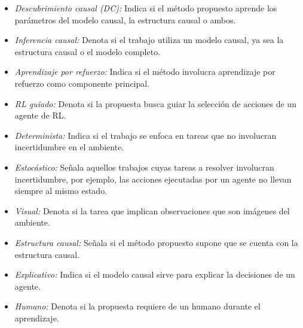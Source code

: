 \begin{itemize}
    \item \textit{Descubrimiento causal (DC):} Indica si el método propuesto aprende los parámetros del modelo causal, la estructura causal o ambos.
    \item \textit{Inferencia causal:} Denota si el trabajo utiliza un modelo causal, ya sea la estructura causal o el modelo completo.
    \item \textit{Aprendizaje por refuerzo:} Indica si el método involucra aprendizaje por refuerzo como componente principal.
    \item \textit{RL guiado:} Denota si la propuesta busca guiar la selección de acciones de un agente de RL.
    \item \textit{Determinista:} Indica si el trabajo se enfoca en tareas que no involucran incertidumbre en el ambiente.
    \item \textit{Estocástico:} Señala aquellos trabajos cuyas tareas a resolver  involucran incertidumbre, por ejemplo, las acciones ejecutadas por un agente no llevan siempre al mismo estado.
    \item \textit{Visual:} Denota si la tarea que implican observaciones que son imágenes del ambiente.
    \item \textit{Estructura causal:} Señala si el método propuesto supone que se cuenta con la estructura causal.
    \item \textit{Explicativo:} Indica si el modelo causal sirve para explicar la decisiones de un agente.
    \item \textit{Humano:} Denota si la propuesta requiere de un humano durante el aprendizaje.
\end{itemize}


